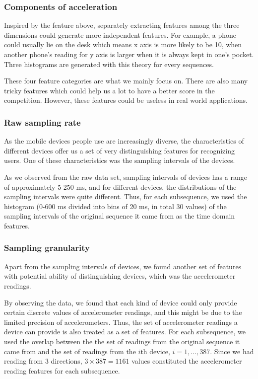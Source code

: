 \documentclass{article} %
\begin{document}
\subsubsection{Components of acceleration}
Inspired by the feature above, separately extracting features among the three dimensions could generate more independent features. For example, a phone could usually lie on the desk which means x axis is more likely to be 10, when another phone's reading for y axis is larger when it is always kept in one's pocket. Three histograms are generated with this theory for every sequences.

These four feature categories are what we mainly focus on. There are also many tricky features which could help us a lot to have a better score in the competition. However, these features could be useless in real world applications. 

\subsubsection{Raw sampling rate}
As the mobile devices people use are increasingly diverse, the characteristics of different devices offer us a set of very distinguishing features for recognizing users. One of these characteristics was the sampling intervals of the devices.

As we observed from the raw data set, sampling intervals of devices has a range of approximately 5-250 ms, and for different devices, the distributions of the sampling intervals were quite different. Thus, for each subsequence, we used the histogram (0-600 ms divided into bins of 20 ms, in total 30 values) of the sampling intervals of the original sequence it came from as the time domain features. 

\subsubsection{Sampling granularity}
Apart from the sampling intervals of devices, we found another set of features with potential ability of distinguishing devices, which was the accelerometer readings.

By observing the data, we found that each kind of device could only provide certain discrete values of accelerometer readings, and this might be due to the limited precision of accelerometers. Thus, the set of accelerometer readings a device can provide is also treated as a set of features. For each subsequence, we used the overlap between the the set of readings from the original sequence it came from and the set of readings from the $i$th device, $i=1,\ldots,387$. Since we had reading from 3 directions, $3\times 387 = 1161$ values constituted the accelerometer reading features for each subsequence.
\end{document}
